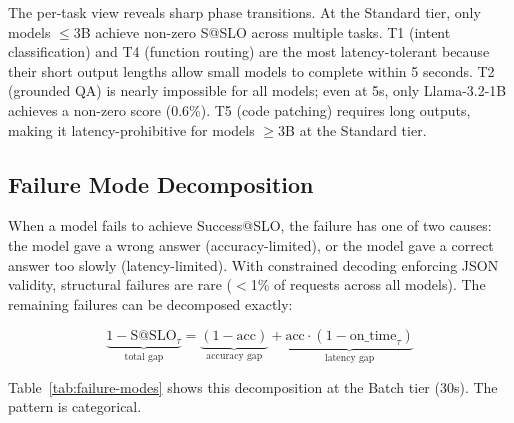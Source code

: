 \documentclass[11pt]{article}
\makeatletter
\newcommand{\sslo}{\ensuremath{\mathrm{S@SLO}}}
\makeatother
\begin{document}
The per-task view reveals sharp phase transitions.  At the Standard tier, only models $\leq$3B achieve non-zero S@SLO across multiple tasks.  T1 (intent classification) and T4 (function routing) are the most latency-tolerant because their short output lengths allow small models to complete within 5 seconds.  T2 (grounded QA) is nearly impossible for all models; even at 5s, only Llama-3.2-1B achieves a non-zero score (0.6\%).  T5 (code patching) requires long outputs, making it latency-prohibitive for models $\geq$3B at the Standard tier.

\subsection{Failure Mode Decomposition}

When a model fails to achieve Success@SLO, the failure has one of two causes: the model gave a wrong answer (accuracy-limited), or the model gave a correct answer too slowly (latency-limited).  With constrained decoding enforcing JSON validity, structural failures are rare ($<$1\% of requests across all models).  The remaining failures can be decomposed exactly:

\begin{equation}
\underbrace{1 - \sslo_\tau}_{\text{total gap}} = \underbrace{(1 - \text{acc})}_{\text{accuracy gap}} + \underbrace{\text{acc} \cdot (1 - \text{on\_time}_\tau)}_{\text{latency gap}}
\end{equation}

Table~\ref{tab:failure-modes} shows this decomposition at the Batch tier (30s).  The pattern is categorical.
\end{document}
